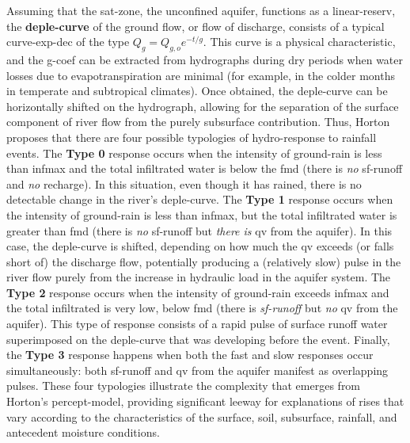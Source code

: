 \documentclass[./main_en.tex]{subfiles}
\begin{document}
\noindent Assuming that the \gls{sat-zone}, the unconfined aquifer, functions as a \gls{linear-reserv}, the \textbf{\gls{deple-curve}} of the ground flow, or flow of discharge, consists of a typical \gls{curve-exp-dec} of the type $Q_{g} = Q_{g, o} e^{-t/g}$. This curve is a physical characteristic, and the \gls{g-coef} can be extracted from hydrographs during dry periods when water losses due to evapotranspiration are minimal (for example, in the colder months in temperate and subtropical climates). Once obtained, the \gls{deple-curve} can be horizontally shifted on the hydrograph, allowing for the separation of the surface component of river flow from the purely subsurface contribution. Thus, Horton proposes that there are four possible typologies of \gls{hydro-response} to rainfall events. The \textbf{Type 0} response occurs when the intensity of \gls{ground-rain} is less than \gls{infmax} and the total infiltrated water is below the \gls{fmd} (there is \textit{no} \gls{sf-runoff} and \textit{no} recharge). In this situation, even though it has rained, there is no detectable change in the river's \gls{deple-curve}. The \textbf{Type 1} response occurs when the intensity of \gls{ground-rain} is less than \gls{infmax}, but the total infiltrated water is greater than \gls{fmd} (there is \textit{no} \gls{sf-runoff} but \textit{there is} \gls{qv} from the aquifer). In this case, the \gls{deple-curve} is shifted, depending on how much the \gls{qv} exceeds (or falls short of) the discharge flow, potentially producing a (relatively slow) pulse in the river flow purely from the increase in hydraulic load in the aquifer \gls{system}. The \textbf{Type 2} response occurs when the intensity of \gls{ground-rain} exceeds \gls{infmax} and the total infiltrated is very low, below \gls{fmd} (there is \textit{sf-runoff} but \textit{no} \gls{qv} from the aquifer). This type of response consists of a rapid pulse of surface runoff water superimposed on the \gls{deple-curve} that was developing before the event. Finally, the \textbf{Type 3} response happens when both the fast and slow responses occur simultaneously: both \gls{sf-runoff} and \gls{qv} from the aquifer manifest as overlapping pulses. These four typologies illustrate the complexity that emerges from Horton’s \gls{percept-model}, providing significant leeway for explanations of rises that vary according to the characteristics of the surface, soil, subsurface, rainfall, and antecedent moisture conditions.
\end{document}
